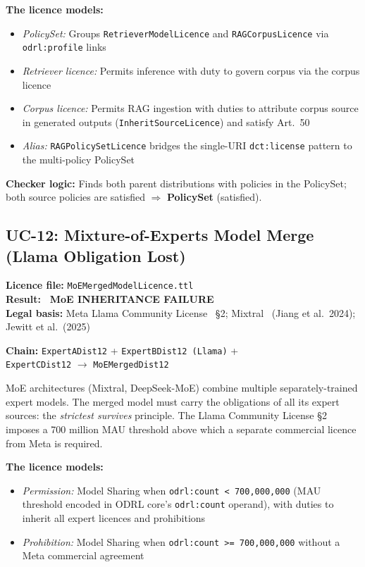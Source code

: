 \documentclass[12pt,a4paper]{article}
\newcommand{\violated}[1]{\textcolor{violation}{\textbf{\texttimes\ #1}}}
\newcommand{\policyset}{\textbf{PolicySet}}
\begin{document}
\textbf{The licence models:}
\begin{itemize}[noitemsep]
  \item \emph{PolicySet:} Groups \texttt{RetrieverModelLicence} and \texttt{RAGCorpusLicence} via \texttt{odrl:profile} links
  \item \emph{Retriever licence:} Permits inference with duty to govern corpus via the corpus licence
  \item \emph{Corpus licence:} Permits RAG ingestion with duties to attribute corpus source in generated outputs (\texttt{InheritSourceLicence}) and satisfy Art.\ 50
  \item \emph{Alias:} \texttt{RAGPolicySetLicence} bridges the single-URI \texttt{dct:license} pattern to the multi-policy PolicySet
\end{itemize}

\textbf{Checker logic:} Finds both parent distributions with policies in the PolicySet; both source policies are satisfied $\Rightarrow$ \policyset{} (satisfied).

\subsection{UC-12: Mixture-of-Experts Model Merge (Llama Obligation Lost)}
\textbf{Licence file:} \texttt{MoEMergedModelLicence.ttl}\\[2pt]
\textbf{Result:} \violated{MoE INHERITANCE FAILURE}\\[4pt]
\textbf{Legal basis:} Meta Llama Community License~\cite{llamalicence} \S 2; Mixtral~\cite{jiang2024mixtral} (Jiang et al.\ 2024); Jewitt et al.\ (2025)

\textbf{Chain:} \texttt{ExpertADist12} + \texttt{ExpertBDist12 (Llama)} +\\
\quad\texttt{ExpertCDist12} $\rightarrow$ \texttt{MoEMergedDist12}

MoE architectures (Mixtral, DeepSeek-MoE) combine multiple separately-trained expert models. The merged model must carry the obligations of all its expert sources: the \emph{strictest survives} principle. The Llama Community License \S 2 imposes a 700 million MAU threshold above which a separate commercial licence from Meta is required.

\textbf{The licence models:}
\begin{itemize}[noitemsep]
  \item \emph{Permission:} Model Sharing when \texttt{odrl:count < 700,000,000} (MAU threshold encoded in ODRL core's \texttt{odrl:count} operand), with duties to inherit all expert licences and prohibitions
  \item \emph{Prohibition:} Model Sharing when \texttt{odrl:count >= 700,000,000} without a Meta commercial agreement
\end{itemize}
\end{document}
